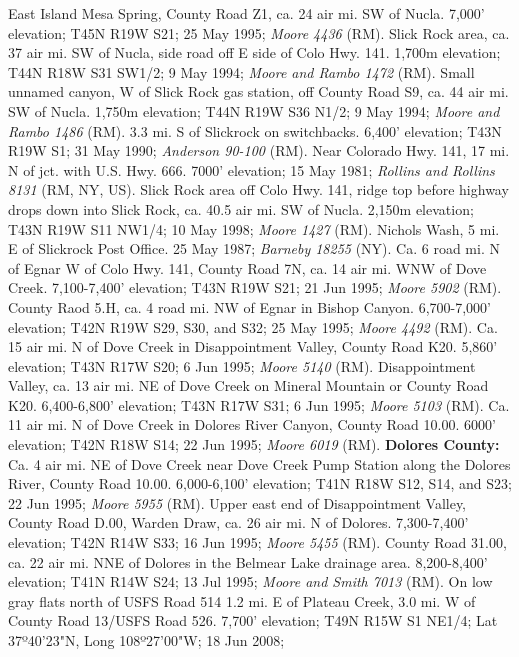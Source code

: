 East Island Mesa Spring, County Road Z1, ca. 24 air mi. SW of Nucla.
7,000' elevation; T45N R19W S21; 25 May 1995; \textit{Moore 4436} (RM).
Slick Rock area, ca. 37 air mi. SW of Nucla, side road off E side of Colo Hwy.
141. 1,700m elevation; T44N R18W S31 SW1/2; 9 May 1994;
\textit{Moore and Rambo 1472} (RM).
Small unnamed canyon, W of Slick Rock gas station, off County Road S9, ca. 44
air mi. SW of Nucla. 1,750m elevation; T44N R19W S36 N1/2; 9 May 1994;
\textit{Moore and Rambo 1486} (RM).
3.3 mi. S of Slickrock on switchbacks. 6,400' elevation; T43N R19W S1;
31 May 1990; \textit{Anderson 90-100} (RM).
Near Colorado Hwy. 141, 17 mi. N of jct. with U.S. Hwy. 666. 7000' elevation;
15 May 1981; \textit{Rollins and Rollins 8131} (RM, NY, US).
Slick Rock area off Colo Hwy. 141, ridge top before highway drops down into
Slick Rock, ca. 40.5 air mi. SW of Nucla. 2,150m elevation; T43N R19W S11 NW1/4;
10 May 1998; \textit{Moore 1427} (RM).
Nichols Wash, 5 mi. E of Slickrock Post Office. 25 May 1987;
\textit{Barneby 18255} (NY).
Ca. 6 road mi. N of Egnar W of Colo Hwy. 141, County Road 7N, ca. 14 air mi. WNW
of Dove Creek. 7,100-7,400' elevation; T43N R19W S21; 21 Jun 1995;
\textit{Moore 5902} (RM).
County Raod 5.H, ca. 4 road mi. NW of Egnar in Bishop Canyon. 6,700-7,000'
elevation; T42N R19W S29, S30, and S32; 25 May 1995; \textit{Moore 4492} (RM).
Ca. 15 air mi. N of Dove Creek in Disappointment Valley, County Road K20.
5,860' elevation; T43N R17W S20; 6 Jun 1995; \textit{Moore 5140} (RM).
Disappointment Valley, ca. 13 air mi. NE of Dove Creek on Mineral Mountain or
County Road K20. 6,400-6,800' elevation; T43N R17W S31; 6 Jun 1995;
\textit{Moore 5103} (RM).
Ca. 11 air mi. N of Dove Creek in Dolores River Canyon, County Road 10.00.
6000' elevation; T42N R18W S14; 22 Jun 1995; \textit{Moore 6019} (RM).
  \textbf{Dolores County:}
Ca. 4 air mi. NE of Dove Creek near Dove Creek Pump Station along the Dolores
River, County Road 10.00. 6,000-6,100' elevation; T41N R18W S12, S14, and S23;
22 Jun 1995; \textit{Moore 5955} (RM).
Upper east end of Disappointment Valley, County Road D.00, Warden Draw, ca. 26
air mi. N of Dolores. 7,300-7,400' elevation; T42N R14W S33; 16 Jun 1995;
\textit{Moore 5455} (RM).
County Road 31.00, ca. 22 air mi. NNE of Dolores in the Belmear Lake drainage
area. 8,200-8,400' elevation; T41N R14W S24; 13 Jul 1995;
\textit{Moore and Smith 7013} (RM).
On low gray flats north of USFS Road 514 1.2 mi. E of Plateau Creek, 3.0 mi. W
of County Road 13/USFS Road 526. 7,700' elevation; T49N R15W S1 NE1/4;
Lat 37º40'23"N, Long 108º27'00"W; 18 Jun 2008;
